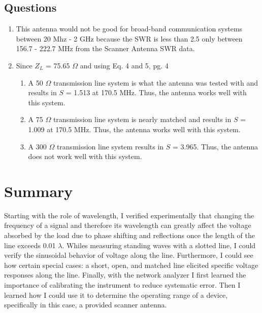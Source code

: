 \documentclass{article}
\begin{document}
\subsection{Questions}
\begin{enumerate}
	\item This antenna would not be good for broad-band communication systems between 20 Mhz - 2 GHz because the SWR is less than 2.5 only between 156.7 - 222.7 MHz from the Scanner Antenna SWR data. 
	
	\item Since $Z_L$ = 75.65 $\Omega$ and using Eq. 4 and 5, pg. 4
	\begin{enumerate}
		\item A 50 $\Omega$ transmission line system is what the antenna was tested with and results in $S$ = 1.513 at 170.5 MHz. Thus, the antenna works well with this system.
		\item A 75 $\Omega$ transmission line system is nearly matched and results in $S$ = 1.009 at 170.5 MHz. Thus, the antenna works well with this system.
		\item A 300 $\Omega$ transmission line system results in $S$ = 3.965. Thus, the antenna does not work well with this system.
	\end{enumerate}
\end{enumerate}

\section{Summary}
Starting with the role of wavelength, I verified experimentally that changing the frequency of a signal and therefore its wavelength can greatly affect the voltage absorbed by the load due to phase shifting and reflections once the length of the line exceeds 0.01 $\lambda$. Whiles measuring standing waves with a slotted line, I could verify the sinusoidal behavior of voltage along the line. Furthermore, I could see how certain special cases: a short, open, and matched line elicited specific voltage responses along the line. Finally, with the network analyzer I first learned the importance of calibrating the instrument to reduce systematic error. Then I learned how I could use it to determine the operating range of a device, specifically in this case, a provided scanner antenna.
\end{document}
